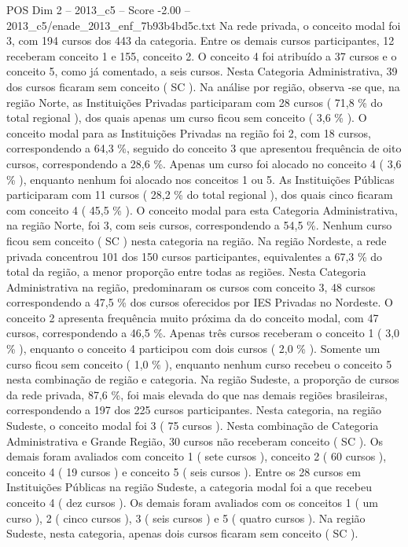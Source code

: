 \begin{textsample}{POS Dim 2 – 2013\_c5 – Score -2.00 – 2013\_c5/enade\_2013\_enf\_7b93b4bd5c.txt}
Na rede privada, o conceito modal foi 3, com 194 cursos dos 443 da categoria.
Entre os demais cursos participantes, 12 receberam conceito 1 e 155, conceito 2.
O conceito 4 foi atribuído a 37 cursos e o conceito 5, como já comentado, a seis cursos.
Nesta Categoria Administrativa, 39 dos cursos ficaram sem conceito ( SC ).
Na análise por região, observa -se que, na região Norte, as Instituições Privadas participaram com 28 cursos ( 71,8 \% do total regional ), dos quais apenas um curso ficou sem conceito ( 3,6 \% ).
O conceito modal para as Instituições Privadas na região foi 2, com 18 cursos, correspondendo a 64,3 \%, seguido do conceito 3 que apresentou frequência de oito cursos, correspondendo a 28,6 \%.
Apenas um curso foi alocado no conceito 4 ( 3,6 \% ), enquanto nenhum foi alocado nos conceitos 1 ou 5.
As Instituições Públicas participaram com 11 cursos ( 28,2 \% do total regional ), dos quais cinco ficaram com conceito 4 ( 45,5 \% ).
O conceito modal para esta Categoria Administrativa, na região Norte, foi 3, com seis cursos, correspondendo a 54,5 \%.
Nenhum curso ficou sem conceito ( SC ) nesta categoria na região.
Na região Nordeste, a rede privada concentrou 101 dos 150 cursos participantes, equivalentes a 67,3 \% do total da região, a menor proporção entre todas as regiões.
Nesta Categoria Administrativa na região, predominaram os cursos com conceito 3, 48 cursos correspondendo a 47,5 \% dos cursos oferecidos por IES Privadas no Nordeste.
O conceito 2 apresenta frequência muito próxima da do conceito modal, com 47 cursos, correspondendo a 46,5 \%.
Apenas três cursos receberam o conceito 1 ( 3,0 \% ), enquanto o conceito 4 participou com dois cursos ( 2,0 \% ).
Somente um curso ficou sem conceito ( 1,0 \% ), enquanto nenhum curso recebeu o conceito 5 nesta combinação de região e categoria.
Na região Sudeste, a proporção de cursos da rede privada, 87,6 \%, foi mais elevada do que nas demais regiões brasileiras, correspondendo a 197 dos 225 cursos participantes.
Nesta categoria, na região Sudeste, o conceito modal foi 3 ( 75 cursos ).
Nesta combinação de Categoria Administrativa e Grande Região, 30 cursos não receberam conceito ( SC ).
Os demais foram avaliados com conceito 1 ( sete cursos ), conceito 2 ( 60 cursos ), conceito 4 ( 19 cursos ) e conceito 5 ( seis cursos ).
Entre os 28 cursos em Instituições Públicas na região Sudeste, a categoria modal foi a que recebeu conceito 4 ( dez cursos ).
Os demais foram avaliados com os conceitos 1 ( um curso ), 2 ( cinco cursos ), 3 ( seis cursos ) e 5 ( quatro cursos ).
Na região Sudeste, nesta categoria, apenas dois cursos ficaram sem conceito ( SC ).

\end{textsample}
